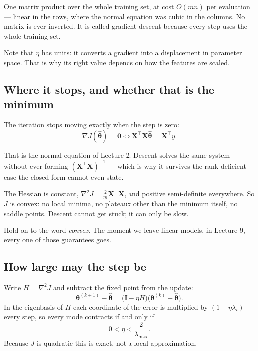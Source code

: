 \documentclass[11pt,a4paper]{article}
\begin{document}
One matrix product over the whole training set, at cost $O(mn)$ per evaluation
--- linear in the rows, where the normal equation was cubic in the columns. No
matrix is ever inverted. It is called  gradient descent because
every step uses the whole training set.

Note that $\eta$ has units: it converts a gradient into a displacement in
parameter space. That is why its right value depends on how the features are
scaled.

\subsection{Where it stops, and whether that is the minimum}

The iteration stops moving exactly when the step is zero:
\[ \nabla J(\hat{\boldsymbol\theta}) = \mathbf{0}
   \iff \mathbf{X}^{\intercal}\mathbf{X}\hat{\boldsymbol\theta}
      = \mathbf{X}^{\intercal}y. \]

\begin{keybox}[title={Descent does not solve a different problem}]
That is the normal equation of Lecture 2. Descent solves the same system
without ever forming $(\mathbf{X}^{\intercal}\mathbf{X})^{-1}$ --- which is why
it survives the rank-deficient case the closed form cannot even state.
\end{keybox}

The Hessian is constant, $\nabla^2 J = \frac{2}{m}\mathbf{X}^{\intercal}
\mathbf{X}$, and positive semi-definite everywhere. So $J$ is convex: no local
minima, no plateaux other than the minimum itself, no saddle points. Descent
cannot get stuck; it can only be slow.

Hold on to the word \emph{convex}. The moment we leave linear models, in
Lecture 9, every one of those guarantees goes.

\subsection{How large may the step be}

Write $H = \nabla^2 J$ and subtract the fixed point from the update:
\[ \boldsymbol\theta^{(k+1)} - \hat{\boldsymbol\theta}
   = \bigl(\mathbf{I} - \eta H\bigr)
     \bigl(\boldsymbol\theta^{(k)} - \hat{\boldsymbol\theta}\bigr). \]
In the eigenbasis of $H$ each coordinate of the error is multiplied by
$(1 - \eta\lambda_i)$ every step, so every mode contracts if and only if
\[ 0 < \eta < \frac{2}{\lambda_{\max}}. \]
Because $J$ is quadratic this is exact, not a local approximation.
\end{document}
